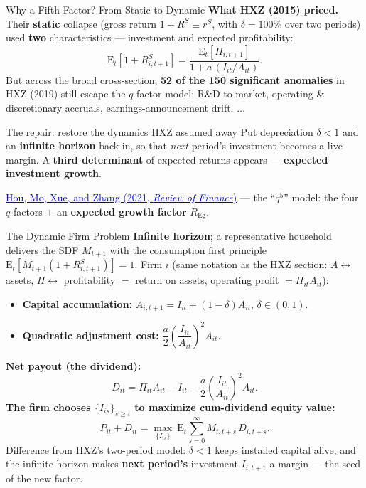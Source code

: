 \documentclass{beamer}
\begin{document}
\begin{frame}{Why a Fifth Factor? From Static to Dynamic}
	\textbf{What HXZ (2015) priced.} Their \textbf{static} collapse (gross return $1+R^S\equiv r^S$, with $\delta=100\%$ over two periods) used \textbf{two} characteristics --- investment and expected profitability:
	\[
		\mathrm{E}_t[1+R^S_{i,t+1}]=\frac{\mathrm{E}_t[\Pi_{i,t+1}]}{1+a\,(I_{it}/A_{it})}.
	\]
	But across the broad cross-section, \textbf{52 of the 150 significant anomalies} in HXZ (2019) still escape the $q$-factor model: R\&D-to-market, operating \& discretionary accruals, earnings-announcement drift, $\dots$
	\begin{block}{The repair: restore the dynamics HXZ assumed away}
		Put depreciation $\delta<1$ and an \textbf{infinite horizon} back in, so that \textit{next} period's investment becomes a live margin. A \textbf{third determinant} of expected returns appears --- \textbf{expected investment growth}.
	\end{block}
	\href{https://doi.org/10.1093/rof/rfaa004}{\textcolor{blue}{Hou, Mo, Xue, and Zhang (2021, \textit{Review of Finance})}} --- the ``$q^5$'' model: the four $q$-factors $+$ an \textbf{expected growth factor} $R_{\text{Eg}}$.
\end{frame}

\begin{frame}{The Dynamic Firm Problem}
	\textbf{Infinite horizon}; a representative household delivers the SDF $M_{t+1}$ with the consumption first principle $\mathrm{E}_t[M_{t+1}(1+R^S_{i,t+1})]=1$. Firm $i$ (same notation as the HXZ section: $A\leftrightarrow$ assets, $\Pi\leftrightarrow$ profitability $=$ return on assets, operating profit $=\Pi_{it}A_{it}$):
	\begin{itemize}
		\item \textbf{Capital accumulation:} $A_{i,t+1}=I_{it}+(1-\delta)A_{it}$, \quad $\delta\in(0,1)$.
		\item \textbf{Quadratic adjustment cost:} $\dfrac{a}{2}\!\left(\dfrac{I_{it}}{A_{it}}\right)^{2}\!A_{it}$.
	\end{itemize}
	\textbf{Net payout (the dividend):}
	\[
		D_{it}=\Pi_{it}A_{it}-I_{it}-\frac{a}{2}\!\left(\frac{I_{it}}{A_{it}}\right)^{2}\!A_{it}.
	\]
	\textbf{The firm chooses $\{I_{is}\}_{s\ge t}$ to maximize cum-dividend equity value:}
	\[
		P_{it}+D_{it}=\max_{\{I_{is}\}}\ \mathrm{E}_t\!\sum_{s=0}^{\infty} M_{t,t+s}\,D_{i,t+s}.
	\]
	{\footnotesize Difference from HXZ's two-period model: $\delta<1$ keeps installed capital alive, and the infinite horizon makes \textbf{next period's} investment $I_{i,t+1}$ a margin --- the seed of the new factor.}
\end{frame}
\end{document}
